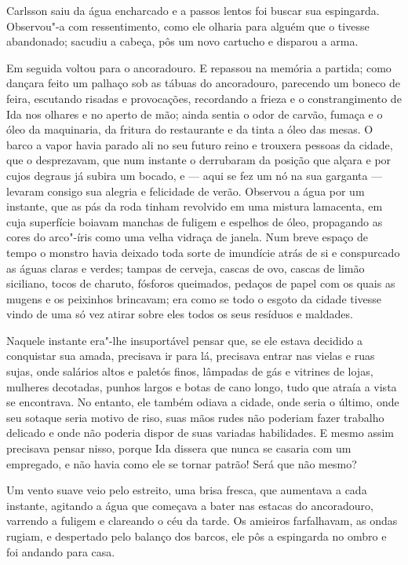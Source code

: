 Carlsson saiu da água encharcado e a passos lentos foi buscar sua
espingarda. Observou"-a com ressentimento, como ele olharia para alguém que o
tivesse abandonado; sacudiu a cabeça, pôs um novo cartucho e disparou a arma.

Em seguida voltou para o ancoradouro. E repassou na memória a partida; como
dançara feito um palhaço sob as tábuas do ancoradouro, parecendo um boneco de
feira, escutando risadas e provocações, recordando a frieza e o constrangimento
de Ida nos olhares e no aperto de mão; ainda sentia o odor de carvão, fumaça e o
óleo da maquinaria, da fritura do restaurante e da tinta a óleo das mesas. O
barco a vapor havia parado ali no seu futuro reino e trouxera pessoas da cidade,
que o desprezavam, que num instante o derrubaram da posição que alçara e por
cujos degraus já subira um bocado, e --- aqui se fez um nó na sua garganta ---
levaram consigo sua alegria e felicidade de verão. Observou a água por um
instante, que as pás da roda tinham revolvido em uma mistura lamacenta, em cuja
superfície boiavam manchas de fuligem e espelhos de óleo, propagando as cores do
arco"-íris como uma velha vidraça de janela. Num breve espaço de tempo o monstro
havia deixado toda sorte de imundície atrás de si e conspurcado as águas claras e
verdes; tampas de cerveja, cascas de ovo, cascas de limão siciliano, tocos de
charuto, fósforos queimados, pedaços de papel com os quais as mugens e os
peixinhos brincavam; era como se todo o esgoto da cidade tivesse vindo de uma só
vez atirar sobre eles todos os seus resíduos e maldades.

Naquele instante era"-lhe insuportável pensar que, se ele estava decidido a
conquistar sua amada, precisava ir para lá, precisava entrar nas vielas e ruas
sujas, onde salários altos e paletós finos, lâmpadas de gás e vitrines de lojas,
mulheres decotadas, punhos largos e botas de cano longo, tudo que atraía a vista
se encontrava. No entanto, ele também odiava a cidade, onde seria o último, onde
seu sotaque seria motivo de riso, suas mãos rudes não poderiam fazer trabalho
delicado e onde não poderia dispor de suas variadas habilidades. E mesmo assim
precisava pensar nisso, porque Ida dissera que nunca se casaria com um
empregado, e não havia como ele se tornar patrão! Será que não mesmo?

Um vento suave veio pelo estreito, uma brisa fresca, que aumentava a cada
instante, agitando a água que começava a bater nas estacas do ancoradouro,
varrendo a fuligem e clareando o céu da tarde. Os amieiros farfalhavam, as ondas
rugiam, e despertado pelo balanço dos barcos, ele pôs a espingarda no ombro e foi
andando para casa.

